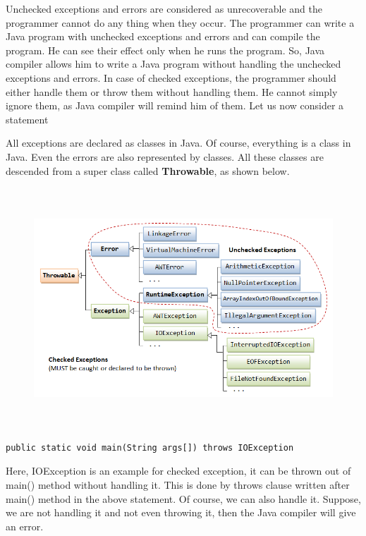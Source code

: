 \documentclass[11pt,a4paper]{article}
\begin{document}
Unchecked exceptions and errors are considered as unrecoverable and the programmer cannot do any thing when they occur. The programmer can write a Java program with unchecked exceptions and errors and can compile the program. He can see their effect only when he runs the program. So, Java compiler allows him to write a Java program without handling the unchecked exceptions and errors. In case of checked exceptions, the programmer should either handle them or throw them without handling them. He cannot simply ignore them, as Java compiler will remind him of them. Let us now consider a statement

All exceptions are declared as classes in Java. Of course, everything is a class in Java. Even the errors are also represented by classes. 
All these classes are descended from a super class called \textbf{Throwable}, as shown below.
\begin{figure}[H]
 \begin{center}
   \includegraphics[height=09cm, width=12cm]{ExceptionClasses.png}
 \end{center}
 \end{figure}
 
\begin{lstlisting}[numbers=none]
public static void main(String args[]) throws IOException
\end{lstlisting}

Here, IOException is an example for checked exception, it can be thrown out of main() method without handling it. This is done by throws clause written after main() method in the above statement. Of course, we can also handle it. Suppose, we are not handling it and not even throwing it, then the Java compiler will give an error.
\end{document}
